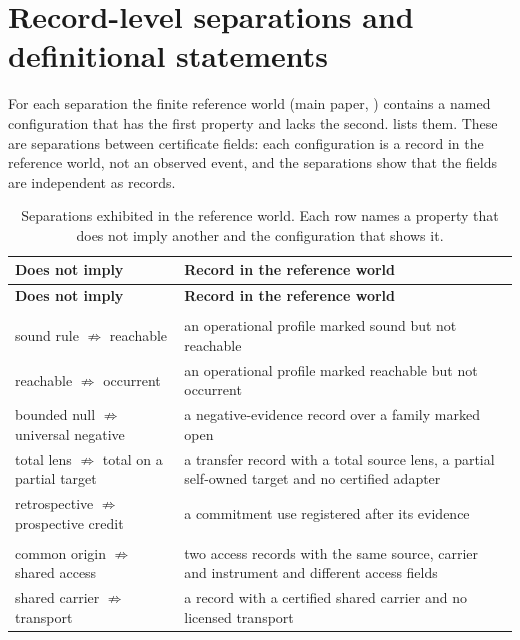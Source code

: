 \section{Record-level separations and definitional statements}
\label{supp:separations}

For each separation the finite reference world (main paper, ) contains a named
configuration that has the first property and lacks the second.
 lists them. These are separations between certificate fields:
each configuration is a record in the reference world, not an observed event, and the
separations show that the fields are independent as records.

{\small
\begin{longtable}{@{}>{\raggedright\arraybackslash}p{5.6cm}>{\raggedright\arraybackslash}p{9.3cm}@{}}
\caption{Separations exhibited in the reference world. Each row names a property that does
not imply another and the configuration that shows it.}
\label{tab:separations}\\
\toprule
\textbf{Does not imply} & \textbf{Record in the reference world} \\
\midrule
\endfirsthead
\toprule
\textbf{Does not imply} & \textbf{Record in the reference world} \\
\midrule
\endhead
\bottomrule
\endfoot
\multicolumn{2}{@{}l}{\emph{Access and admission}}\\
sound rule $\not\Rightarrow$ reachable & an operational profile marked sound but not reachable \\
reachable $\not\Rightarrow$ occurrent & an operational profile marked reachable but not occurrent \\
bounded null $\not\Rightarrow$ universal negative & a negative-evidence record over a family marked open \\
total lens $\not\Rightarrow$ total on a partial target & a transfer record with a total source lens, a partial self-owned target and no certified adapter \\
retrospective $\not\Rightarrow$ prospective credit & a commitment use registered after its evidence \\
\midrule
\multicolumn{2}{@{}l}{\emph{Contact and join}}\\
common origin $\not\Rightarrow$ shared access & two access records with the same source, carrier and instrument and different access fields \\
shared carrier $\not\Rightarrow$ transport & a record with a certified shared carrier and no licensed transport \\

\end{longtable}}
